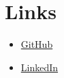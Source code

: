 \section{Links}
	\begin{itemize}
		\item \href{https://github.com/jondalnas}{GitHub}
		\item \href{https://www.linkedin.com/in/jonas-jensen-68a1091b1/}{LinkedIn}
	\end{itemize}
